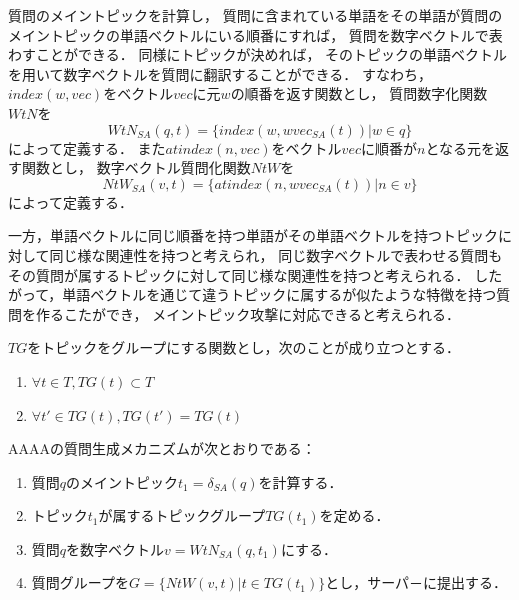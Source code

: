\documentclass[master]{suribt}
\theoremstyle{definition}
\begin{document}
 質問のメイントピックを計算し，
 質問に含まれている単語をその単語が質問のメイントピックの単語ベクトルにいる順番にすれば，
 質問を数字ベクトルで表わすことができる．
 同様にトピックが決めれば，
 そのトピックの単語ベクトルを用いて数字ベクトルを質問に翻訳することができる．
 すなわち，$index(w,vec)$をベクトル$vec$に元$w$の順番を返す関数とし，
 質問数字化関数$WtN$を
 \begin{equation}
  WtN_{SA}(q,t)  = \{index(w,wvec_{SA}(t))| w \in q\}
 \end{equation}
 によって定義する．
 また$atindex(n,vec)$をベクトル$vec$に順番が$n$となる元を返す関数とし，
 数字ベクトル質問化関数$NtW$を
 \begin{equation}
  NtW_{SA}(v,t)  = \{atindex(n,wvec_{SA}(t))| n \in v\}
 \end{equation}
 によって定義する．

 一方，単語ベクトルに同じ順番を持つ単語がその単語ベクトルを持つトピックに対して同じ様な関連性を持つと考えられ，
 同じ数字ベクトルで表わせる質問もその質問が属するトピックに対して同じ様な関連性を持つと考えられる．
 したがって，単語ベクトルを通じて違うトピックに属するが似たような特徴を持つ質問を作るこたができ，
 メイントピック攻撃に対応できると考えられる．
 
 $TG$をトピックをグループにする関数とし，次のことが成り立つとする．
 \begin{enumerate}
 \renewcommand{\labelenumi}{(\roman{enumi})}
 \item $\forall t \in T,TG(t) \subset T$ 
 \item $\forall t' \in TG(t),TG(t') = TG(t)$
 \end{enumerate}
 
 AAAAの質問生成メカニズムが次とおりである：
 \begin{enumerate}
 \renewcommand{\labelenumi}{(\roman{enumi})}
 \item 質問$q$のメイントピック$t_1 = \delta_{SA}(q)$を計算する． 
 \item トピック$t_1$が属するトピックグループ$TG(t_1)$を定める．
 \item 質問$q$を数字ベクトル$v = WtN_{SA}(q,t_1)$にする．
 \item 質問グループを$G = \{NtW(v,t)|t \in TG(t_1)\}$とし，サーパ－に提出する．
 \end{enumerate}
\end{document}
